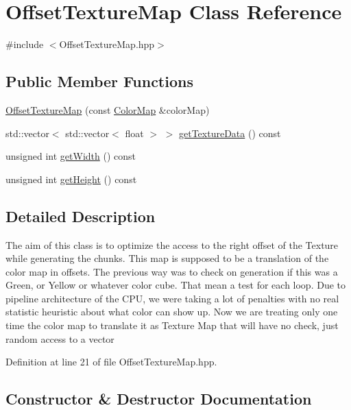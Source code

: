 \hypertarget{class_offset_texture_map}{}\section{Offset\+Texture\+Map Class Reference}
\label{class_offset_texture_map}


{\ttfamily \#include $<$Offset\+Texture\+Map.\+hpp$>$}

\subsection*{Public Member Functions}
\begin{DoxyCompactItemize}
\item 
\hyperlink{class_offset_texture_map_afeb20fdd993b9d4482c4c72384f884d4}{Offset\+Texture\+Map} (const \hyperlink{classglimac_1_1_color_map}{Color\+Map} \&color\+Map)
\item 
std\+::vector$<$ std\+::vector$<$ float $>$ $>$ \hyperlink{class_offset_texture_map_a6bbac444751f0796e88bd98548fa5682}{get\+Texture\+Data} () const
\item 
unsigned int \hyperlink{class_offset_texture_map_af96d09140f305cebb8e39fabcef79d63}{get\+Width} () const
\item 
unsigned int \hyperlink{class_offset_texture_map_a8b02667e403b0a21e817e844a01b8dd4}{get\+Height} () const
\end{DoxyCompactItemize}


\subsection{Detailed Description}
The aim of this class is to optimize the access to the right offset of the Texture while generating the chunks. This map is supposed to be a translation of the color map in offsets. The previous way was to check on generation if this was a Green, or Yellow or whatever color cube. That mean a test for each loop. Due to pipeline architecture of the C\+PU, we were taking a lot of penalties with no real statistic heuristic about what color can show up. Now we are treating only one time the color map to translate it as Texture Map that will have no check, just random access to a vector 

Definition at line 21 of file Offset\+Texture\+Map.\+hpp.



\subsection{Constructor \& Destructor Documentation}
\mbox{\label{class_offset_texture_map_afeb20fdd993b9d4482c4c72384f884d4}} 
